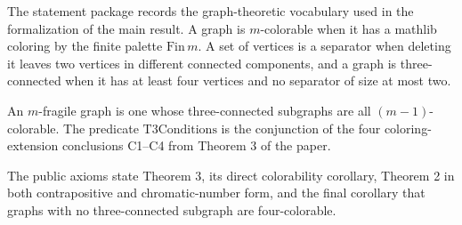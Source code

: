 The statement package records the graph-theoretic vocabulary used in the
formalization of the main result.  A graph is \(m\)-colorable when it has a
mathlib coloring by the finite palette \(\mathrm{Fin}\,m\).  A set of vertices
is a separator when deleting it leaves two vertices in different connected
components, and a graph is three-connected when it has at least four vertices
and no separator of size at most two.

An \(m\)-fragile graph is one whose three-connected subgraphs are all
\((m-1)\)-colorable.  The predicate \(\mathrm{T3Conditions}\) is the conjunction
of the four coloring-extension conclusions C1--C4 from Theorem 3 of the paper.

The public axioms state Theorem 3, its direct colorability corollary, Theorem 2
in both contrapositive and chromatic-number form, and the final corollary that
graphs with no three-connected subgraph are four-colorable.
